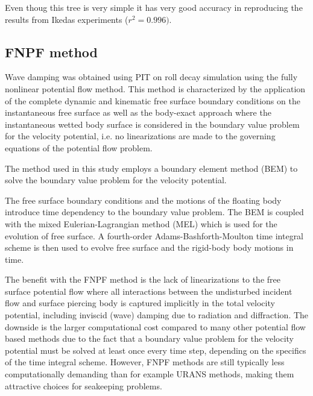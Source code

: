     Even thoug this tree is very simple it has very good accuracy in
reproducing the results from Ikedas experiments ($r^2=0.996)$.

    \subsection*{FNPF method}\label{fnpf-method}

\label{fnpf-method} Wave damping was obtained using PIT on roll decay
simulation using the fully nonlinear potential flow method. This method
is characterized by the application of the complete dynamic and
kinematic free surface boundary conditions on the instantaneous free
surface as well as the body-exact approach where the instantaneous
wetted body surface is considered in the boundary value problem for the
velocity potential, i.e. no linearizations are made to the governing
equations of the potential flow problem.

The method used in this study employs a boundary element method (BEM)
\citep{7505983/FD4N3DW2} to solve the boundary value problem for the
velocity potential.

The free surface boundary conditions and the motions of the floating
body introduce time dependency to the boundary value problem. The BEM is
coupled with the mixed Eulerian-Lagrangian method (MEL)
\citep{7505983/ZKB494GT} which is used for the evolution of free surface.
A fourth-order Adams-Bashforth-Moulton time integral scheme is then used
to evolve free surface and the rigid-body body motions in time.

The benefit with the FNPF method is the lack of linearizations to the
free surface potential flow where all interactions between the
undisturbed incident flow and surface piercing body is captured
implicitly in the total velocity potential, including inviscid (wave)
damping due to radiation and diffraction. The downside is the larger
computational cost compared to many other potential flow based methods
due to the fact that a boundary value problem for the velocity potential
must be solved at least once every time step, depending on the specifics
of the time integral scheme. However, FNPF methods are still typically
less computationally demanding than for example URANS methods, making
them attractive choices for seakeeping problems.

    
